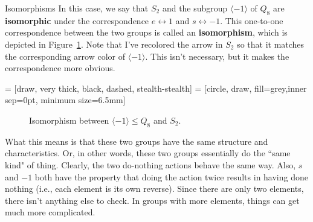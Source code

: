 \begin{section}{Isomorphisms}
In this case, we say that $S_2$ and the subgroup $\langle -1\rangle$ of $Q_8$ are \textbf{isomorphic} under the correspondence $e\leftrightarrow 1$ and $s\leftrightarrow -1$.  This one-to-one correspondence between the two groups is called an \textbf{isomorphism}, which is depicted in Figure~\ref{fig:isoS2}. Note that I've recolored the arrow in $S_2$ so that it matches the corresponding arrow color of $\langle -1\rangle$.  This isn't necessary, but it makes the correspondence more obvious.

 = [draw, very thick, black, dashed, stealth-stealth]
 = [circle, draw, fill=grey,inner sep=0pt, minimum size=6.5mm]

\begin{figure}[!ht]
\centering
{}
\caption{Isomorphism between $\langle -1\rangle\leq Q_8$ and $S_2$.}\label{fig:isoS2}
\end{figure}

What this means is that these two groups have the same structure and characteristics.  Or, in other words, these two groups essentially do the ``same kind" of thing.  Clearly, the two do-nothing actions behave the same way.  Also, $s$ and $-1$ both have the property that doing the action twice results in having done nothing (i.e., each element is its own reverse).  Since there are only two elements, there isn't anything else to check.  In groups with more elements, things can get much more complicated.  


\end{section}
